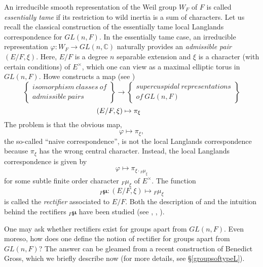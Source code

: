 \documentclass[11pt]{amsart}
\theoremstyle{plain}
\theoremstyle{definition}
\begin{document}
An irreducible smooth representation of the Weil group $W_F$ of $F$ is
called \emph{essentially tame} if its restriction to wild inertia is a
sum of characters.  Let us recall the classical construction of the
essentially tame local Langlands correspondence for $GL(n,F)$.  In the
essentially tame case, an irreducible representation $\varphi : W_F
\rightarrow GL(n,\mathbb{C})$ naturally provides an \emph{admissible
  pair} $(E/F, \xi)$.  Here, $E/F$ is a degree $n$ separable extension
and $\xi$ is a character (with certain conditions) of $E^{\times}$,
which one can view as a maximal elliptic torus in $GL(n,F)$.  Howe
constructs a map (see \cite{howe})
\begin{equation*}
\left\{
\begin{array}{ll}
isomorphism \ classes \ of \\
admissible \ pairs
\end{array}
\right\} \rightarrow \left\{
\begin{array}{ll}
supercuspidal \ representations \\
of \ GL(n,F)
\end{array} \right\}
\end{equation*}
$$\hspace{-.5in} (E/F, \xi) \mapsto \pi_{\xi}$$
The problem is that the obvious map, $$\varphi \mapsto \pi_{\xi},$$
the so-called ``naive correspondence'', is not the local Langlands
correspondence because $\pi_{\xi}$ has the wrong central character.
Instead, the local Langlands correspondence is given by $$\varphi
\mapsto \pi_{\xi \cdot {}_F \mu_{\xi}}$$ for some subtle finite order
character ${}_F \mu_{\xi}$ of $E^{\times}$.  The function $${}_F
\boldsymbol\mu : (E/F, \xi) \mapsto {}_F \mu_{\xi}$$ is called the
\emph{rectifier} associated to $E/F$.  Both the description of and the
intuition behind the rectifiers ${}_F \boldsymbol\mu$ have been
studied (see \cite{bushnellhenniart}, \cite{geo}, \cite{adrian}).

One may ask whether rectifiers exist for groups apart from $GL(n,F)$.
Even moreso, how does one define the notion of rectifier for
groups apart from $GL(n,F)$?  The answer can be gleamed from a recent
construction of Benedict Gross, which we briefly describe now (for
more details, see \S\ref{groupsoftypeL}).
\end{document}
